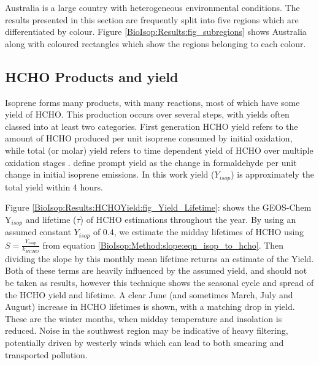   Australia is a large country with heterogeneous environmental conditions.
  The results presented in this section are frequently split into five regions which are differentiated by colour.
  Figure \ref{BioIsop:Results:fig_subregions} shows Australia along with coloured rectangles which show the regions belonging to each colour.
  
  
  \subsection{HCHO Products and yield}
    \label{BioIsop:Results:HCHOYield}
    
    Isoprene forms many products, with many reactions, most of which have some yield of HCHO.
    This production occurs over several steps, with yields often classed into at least two categories.
    First generation HCHO yield refers to the amount of HCHO produced per unit isoprene consumed by initial oxidation, while total (or molar) yield refers to time dependent yield of HCHO over multiple oxidation stages \parencite{Wolfe2016}.
    \textcite{Wolfe2016} define prompt yield as the change in formaldehyde per unit change in initial isoprene emissions.
    In this work yield ($Y_{isop}$) is approximately the total yield within 4 hours.
    
    Figure \ref{BioIsop:Results:HCHOYield:fig_Yield_Lifetime}: shows the GEOS-Chem Y$_{isop}$ and lifetime ($\tau$) of HCHO estimations throughout the year.
    By using an assumed constant $Y_{isop}$ of 0.4, we estimate the midday lifetimes of HCHO using $S = \frac{Y_{isop}}{k_{HCHO}}$ from equation \ref{BioIsop:Method:slope:eqn_isop_to_hcho}.
    Then dividing the slope by this monthly mean lifetime returns an estimate of the Yield.
    Both of these terms are heavily influenced by the assumed yield, and should not be taken as results, however this technique shows the seasonal cycle and spread of the HCHO yield and lifetime.
    A clear June (and sometimes March, July and August) increase in HCHO lifetimes is shown, with a matching drop in yield. 
    These are the winter months, when midday temperature and insolation is reduced.
    Noise in the southwest region may be indicative of heavy filtering, potentially driven by westerly winds which can lead to both smearing and transported pollution.
    
